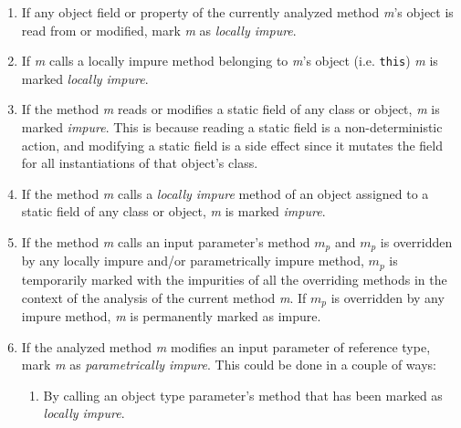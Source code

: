 \documentclass[a4paper,12pt]{article}
\begin{document}
\begin{enumerate}
  \item If any object field or property of the currently analyzed method \textit{m}'s object is read from or modified, mark \textit{m} as \textit{locally impure}. \label{itm:locally-impure}
  \item If \textit{m} calls a locally impure method belonging to \textit{m}'s object (i.e. \texttt{this}) \textit{m} is marked \textit{locally impure}.
  \item If the method \textit{m} reads or modifies a static field of any class or object, \textit{m} is marked \textit{impure}. This is because reading a static field is a non-deterministic action, and modifying a static field is a side effect since it mutates the field for all instantiations of that object's class. \label{itm:static-impure}
  \item If the method \textit{m} calls a \textit{locally impure} method of an object assigned to a static field of any class or object, \textit{m} is marked \textit{impure}.
  \item If the method \textit{m} calls an input parameter's method $m_p$ and $m_p$ is overridden by any locally impure and/or parametrically impure method, $m_p$ is temporarily marked with the impurities of all the overriding methods in the context of the analysis of the current method \textit{m}. If $m_p$ is overridden by any impure method, \textit{m} is permanently marked as impure.
  \item If the analyzed method \textit{m} modifies an input parameter of reference type, mark \textit{m} as \textit{parametrically impure}. This could be done in a couple of ways: \label{itm:parametrically-impure}
    \begin{enumerate}
      \item By calling an object type parameter's method that has been marked as \textit{locally impure}. \label{itm:parametrically-impure-sub1}

\end{enumerate}
\end{enumerate}
\end{document}
